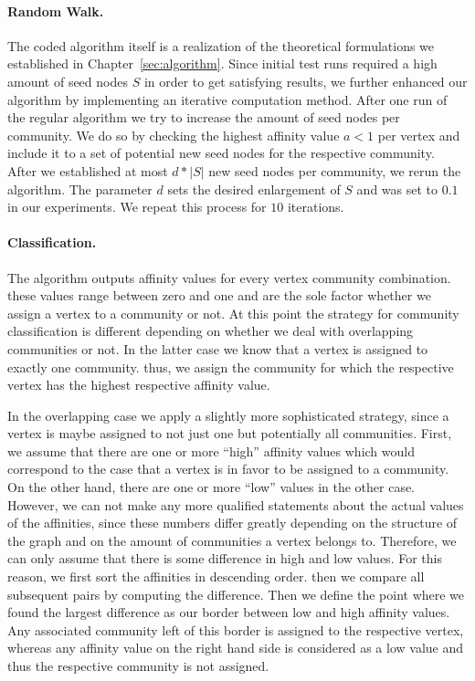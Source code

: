 \paragraph{Random Walk.}
The coded algorithm itself is a realization of the theoretical formulations we 
established in Chapter~\ref{sec:algorithm}. Since initial test runs required a high amount
of seed nodes $S$ in order to get satisfying results, we further enhanced our algorithm by implementing 
an iterative computation method. After one run of the regular algorithm we try to increase the amount of 
seed nodes per community. We do so by checking the highest affinity value $a < 1$ per vertex and include 
it to a set of potential new seed nodes for the respective community. After we established at most 
$d * \left| S \right|$ new seed nodes per community, we rerun the algorithm. The parameter $d$ sets 
the desired enlargement of $S$ and was set to $0.1$ in our experiments. We repeat this process for 
$10$ iterations.

\paragraph{Classification.}
The algorithm outputs affinity values for every vertex community combination. 
these values range between zero and one and are the sole factor whether we 
assign a vertex to a community or not. At this point the strategy for community classification is different depending on whether we deal with overlapping communities or not. In the latter case we know that a vertex is assigned to exactly one community. thus, we assign the community for which the respective vertex has the highest respective affinity value. 

In the overlapping case we apply a slightly more sophisticated strategy, since a vertex is maybe assigned to not just one but potentially all communities. First, we assume that there are one or more ``high'' affinity values which would correspond to the 
case that a vertex is in favor to be assigned to a community. On the other hand, there are one or more ``low'' values in the other case. However, we can not make any more qualified statements about the actual values of the affinities, since these numbers differ greatly depending on the structure of the graph and on the amount of communities a vertex belongs to. Therefore, we can only assume that there is some difference in high and low values. For this reason, we first sort the affinities in descending order. then we compare all subsequent pairs by computing the difference. Then we define the point where we found the largest difference as our border between low and high affinity values. Any associated community left of this border is assigned to the respective vertex, whereas any affinity value on the right hand side is considered as a low value and thus the respective community is not assigned.

